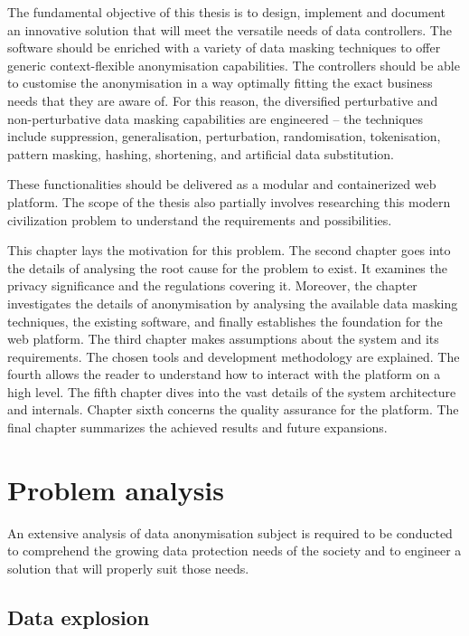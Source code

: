 \documentclass[a4paper,twoside,12pt]{book}
\begin{document}
The fundamental objective of this thesis is to design, implement and document an innovative solution that will meet the versatile needs of data controllers. The software should be enriched with a variety of data masking techniques to offer generic context-flexible anonymisation capabilities. The controllers should be able to customise the anonymisation in a way optimally fitting the exact business needs that they are aware of. For this reason, the diversified perturbative and non-perturbative data masking capabilities are engineered -- the techniques include suppression, generalisation, perturbation, randomisation, tokenisation, pattern masking, hashing, shortening, and artificial data substitution.

These functionalities should be delivered as a modular and containerized web platform. The scope of the thesis also partially involves researching this modern civilization problem to understand the requirements and possibilities.

This chapter lays the motivation for this problem. The second chapter goes into the details of analysing the root cause for the problem to exist. It examines the privacy significance and the regulations covering it. Moreover, the chapter investigates the details of anonymisation by analysing the available data masking techniques, the existing software, and finally establishes the foundation for the web platform. The third chapter makes assumptions about the system and its requirements. The chosen tools and development methodology are explained. The fourth allows the reader to understand how to interact with the platform on a high level. The fifth chapter dives into the vast details of the system architecture and internals. Chapter sixth concerns the quality assurance for the platform. The final chapter summarizes the achieved results and future expansions.


\chapter{Problem analysis}

An extensive analysis of data anonymisation subject is required to be conducted to comprehend the growing data protection needs of the society and to engineer a solution that will properly suit those needs.

\section{Data explosion}
\end{document}

